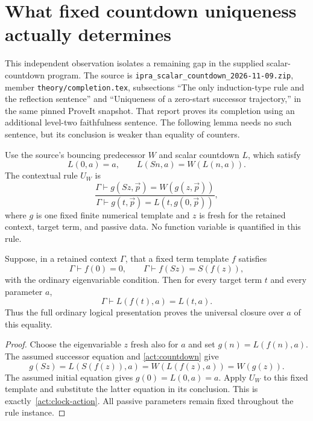 
\section{What fixed countdown uniqueness actually determines}
\label{sec:countdown-action}

This independent observation isolates a remaining gap in the supplied
scalar-countdown program. The source is
\texttt{ipra\_scalar\_countdown\_2026-11-09.zip},
member \texttt{theory/completion.tex}, subsections
``The only induction-type rule and the reflection sentence'' and
``Uniqueness of a zero-start successor trajectory,'' in the same pinned
ProveIt snapshot. That report proves its completion using an additional
level-two faithfulness sentence. The following lemma needs no such
sentence, but its conclusion is weaker than equality of counters.

Use the source's bouncing predecessor $W$ and scalar countdown $L$,
which satisfy
\[
 L(0,a)=a,\qquad L(Sn,a)=W(L(n,a)).
 \tag{Countdown}\label{act:countdown}
\]
The contextual rule $U_W$ is
\[
 \frac{\Gamma\vdash g(Sz,\vec p)=W(g(z,\vec p))}
      {\Gamma\vdash g(t,\vec p)=L(t,g(0,\vec p))},
 \tag{$U_W$}\label{act:UW}
\]
where $g$ is one fixed finite numerical template and $z$ is fresh for the
retained context, target term, and passive data. No function variable is
quantified in this rule.

\begin{lemma}
\label{act:clock-observation}
Suppose, in a retained context $\Gamma$, that a fixed term template $f$
satisfies
\[
        \Gamma\vdash f(0)=0,
        \qquad \Gamma\vdash f(Sz)=S(f(z)),
\]
with the ordinary eigenvariable condition. Then for every target term
$t$ and every parameter $a$,
\[
                  \Gamma\vdash L(f(t),a)=L(t,a).
                  \tag{Action}\label{act:clock-action}
\]
Thus the full ordinary logical presentation proves the universal closure
over $a$ of this equality.
\end{lemma}

\begin{proof}
Choose the eigenvariable $z$ fresh also for $a$ and set
$g(n)=L(f(n),a)$. The assumed successor equation and
\eqref{act:countdown} give
\[
 g(Sz)=L(S(f(z)),a)=W(L(f(z),a))=W(g(z)).
\]
The assumed initial equation gives $g(0)=L(0,a)=a$. Apply
$U_W$ to this fixed template and substitute the latter equation in its
conclusion. This is exactly~\eqref{act:clock-action}. All passive
parameters remain fixed throughout the rule instance.
\end{proof}

